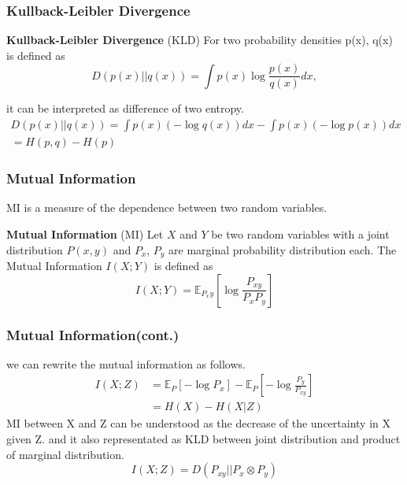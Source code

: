 \documentclass{beamer}
\begin{document}
\begin{frame}
	\frametitle{Kullback-Leibler Divergence}
	\begin{definition}
		\textbf{Kullback-Leibler Divergence} (KLD) For two probability densities p(x), q(x) is defined as
		\begin{equation*}D(p(x)||q(x))
			= \int p(x) \log \frac{p(x)}{q(x)}dx,\end{equation*}
	\end{definition}
	it can be interpreted as difference of two entropy.
	\begin{align*}
		D(p(x)||q(x)) = \int p(x) (-\log{q(x)})dx - \int p(x) (-\log{p(x)})dx \\
		= H(p, q) - H(p)
	\end{align*}
\end{frame}

\begin{frame}
	\frametitle{Mutual Information} 
	MI is a measure of the dependence between two random variables.
	\begin{definition} \label{def:mutual_information}
		\textbf{Mutual Information} (MI) Let $X$ and $Y$ be two random variables with a joint
		distribution $P(x, y)$ and $P_x$, $P_y$ are marginal probability distribution each.
		The Mutual Information $I(X;Y)$ is defined as
		\begin{equation*}I(X;Y) = \mathbb{E}_{P_xy} [\log\frac{P_{xy}}{P_x P_y}]\end{equation*}
	\end{definition}	
\end{frame}

\begin{frame}
	\frametitle{Mutual Information(cont.)}
	we can rewrite the mutual information as follows.
	\begin{align*}
		I(X;Z)&= \mathbb{E}_P[-\log P_x] - \mathbb{E}_P[-\log\frac{P_y}{P_{xy}}]\\
		&= H(X)-H(X|Z)
	\end{align*}
	MI between X and Z can be understood as the decrease of the uncertainty in X given Z.
	and it also representated as KLD between joint distribution and product of marginal distribution.
	\begin{equation}\label{eq:kl_form} I(X;Z) = D(P_{xy}||P_{x} \otimes P_{y}) \end{equation}
\end{frame}
\end{document}
